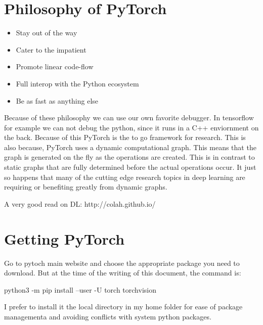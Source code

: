\documentclass[11pt,twoside,a4paper]{report}
\begin{document}
\section{Philosophy of PyTorch}

\begin{itemize}
    \item Stay out of the way
    \item Cater to the impatient
    \item Promote linear code-flow
    \item Full interop with the Python ecosystem
    \item Be as fast as anything else
\end{itemize}

Because of these philosophy we can use our own favorite debugger. In tensorflow for example we can not debug the python, since it runs in a C++ enviornment on the back.
Because of this PyTorch is the to go framework for research. This is also because, PyTorch uses a dynamic computational graph. This means that the graph is generated on the fly as the operations are created. This is in contrast to static graphs that are fully determined before the actual operations occur.
It just so happens that many of the cutting edge research topics in deep learning are requiring or benefiting greatly from dynamic graphs. 

A very good read on DL: http://colah.github.io/

\section{Getting PyTorch}
Go to pytoch main website and choose the appropriate package you need to download.
But at the time of the writing of this document, the command is: 

python3 -m pip install --user -U torch torchvision

I prefer to install it the local directory in my home folder for ease of package managementa and avoiding conflicts with system python packages. 
\end{document}
